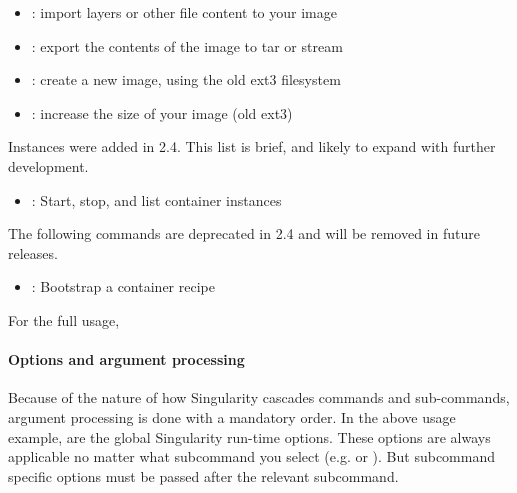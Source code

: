 \documentclass[letterpaper,10pt,english]{sphinxmanual}
\begin{document}
\begin{itemize}
\item {} 
 : import layers or other file content to your image

\item {} 
 : export the contents of the image to tar or stream

\item {} 
 : create a new image, using the old ext3 filesystem

\item {} 
 : increase the size of your image (old ext3)

\end{itemize}


Instances were added in 2.4. This list is brief, and likely to expand
with further development.
\begin{itemize}
\item {} 
 : Start, stop, and list container instances

\end{itemize}

The following commands are deprecated in 2.4 and will be removed in
future releases.
\begin{itemize}
\item {} 
 : Bootstrap a container recipe

\end{itemize}

For the full usage, 


\paragraph{Options and argument processing}
\label{\detokenize{appendix:options-and-argument-processing}}
Because of the nature of how Singularity cascades commands and
sub-commands, argument processing is done with a mandatory order.
 In the
above usage example,  are the global Singularity run-time options.
These options are always applicable no matter what subcommand you
select (e.g.  or  ). But subcommand specific options must be passed
after the relevant subcommand.
\end{document}
